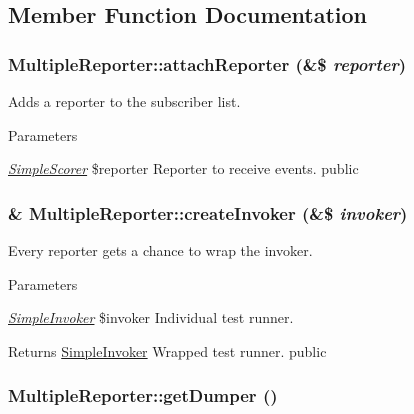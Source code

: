 \subsection{Member Function Documentation}
\hypertarget{class_multiple_reporter_ad3b169ee8f199123620cb05f6e31051e}{
\subsubsection[{attachReporter}]{\setlength{\rightskip}{0pt plus 5cm}MultipleReporter::attachReporter (\&\$ {\em reporter})}}
\label{class_multiple_reporter_ad3b169ee8f199123620cb05f6e31051e}
Adds a reporter to the subscriber list. 
\begin{DoxyParams}{Parameters}
\item[{\em \hyperlink{class_simple_scorer}{SimpleScorer}}]\$reporter Reporter to receive events.  public \end{DoxyParams}
\hypertarget{class_multiple_reporter_a8b5c73bd1dd2139b95d1c8a50e760068}{
\subsubsection[{createInvoker}]{\setlength{\rightskip}{0pt plus 5cm}\& MultipleReporter::createInvoker (\&\$ {\em invoker})}}
\label{class_multiple_reporter_a8b5c73bd1dd2139b95d1c8a50e760068}
Every reporter gets a chance to wrap the invoker. 
\begin{DoxyParams}{Parameters}
\item[{\em \hyperlink{class_simple_invoker}{SimpleInvoker}}]\$invoker Individual test runner. \end{DoxyParams}
\begin{DoxyReturn}{Returns}
\hyperlink{class_simple_invoker}{SimpleInvoker} Wrapped test runner.  public 
\end{DoxyReturn}
\hypertarget{class_multiple_reporter_ae0a4ebf1c103d8b65b32245a828f7256}{
\subsubsection[{getDumper}]{\setlength{\rightskip}{0pt plus 5cm}MultipleReporter::getDumper ()}}
